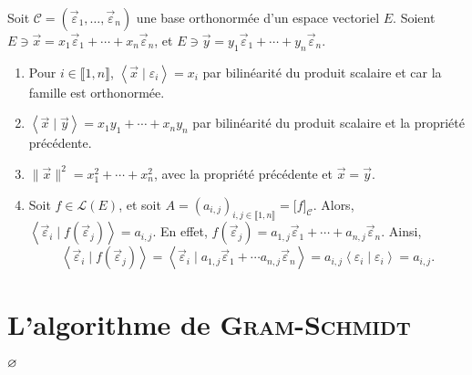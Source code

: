\begin{rmkn}
	Soit $\mathcal{C} = (\vec{\varepsilon}_1, \ldots, \vec{\varepsilon}_n)$\/ une base orthonormée d'un espace vectoriel $E$. Soient $E \owns \vec{x} = x_1 \vec{\varepsilon}_1 + \cdots + x_n \vec{\varepsilon}_n$, et $E \owns \vec{y} = y_1 \vec{\varepsilon}_1 + \cdots + y_n \vec{\varepsilon}_n$.
	\begin{enumerate}
		\item Pour $i \in \llbracket 1,n \rrbracket$, $\left<\vec{x}  \mid \varepsilon_i \right> = x_i$ par bilinéarité du produit scalaire et car la famille est orthonormée.
		\item $\left<\vec{x}  \mid \vec{y} \right> = x_1y_1 + \cdots + x_n y_n$\/ par bilinéarité du produit scalaire et la propriété précédente.
		\item $\|\vec{x}\|^2 = x_1^2 + \cdots + x_n^2$, avec la propriété précédente et $\vec{x} = \vec{y}$.
		\item Soit $f \in \mathcal{L}(E)$, et soit $A = (a_{i,j})_{i,j \in \llbracket 1,n \rrbracket} = \big[f\big]_\mathcal{C}$.
			Alors, $\left<\vec{\varepsilon}_i  \mid f(\vec{\varepsilon}_j) \right> = a_{i,j}$.
			En effet, $f(\vec{\varepsilon}_j) = a_{1,j} \vec{\varepsilon}_1 + \cdots  + a_{n,j} \vec{\varepsilon}_n$.
			Ainsi, \[
				\left< \vec{\varepsilon}_i \mid f(\vec{\varepsilon}_j) \right> = \left< \vec{\varepsilon}_i \mid a_{1,j}\vec{\varepsilon}_1 + \cdots a_{n,j} \vec{\varepsilon}_n\right> = a_{i,j} \left<\varepsilon_i  \mid \varepsilon_i \right> = a_{i,j}
			.\]
	\end{enumerate}
\end{rmkn}


\section{L’algorithme de \textsc{Gram}-\textsc{Schmidt}}

\begin{rmk}
	$\varnothing$
\end{rmk}

